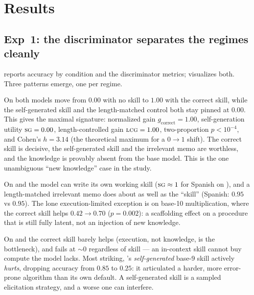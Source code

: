 \section{Results}
\label{sec:results}

\subsection{Exp~1: the discriminator separates the regimes cleanly}
\label{sec:results_exp1}

 reports accuracy by condition and  the
discriminator metrics;  visualizes both. Three patterns emerge, one per
regime.



 On \vocabzeth both models
move from $0.00$ with no skill to $1.00$ with the correct skill, while the self-generated skill
and the length-matched control both stay pinned at $0.00$. This gives the maximal \END
signature: normalized gain $g_{\text{correct}}=1.00$, self-generation utility $\textsc{sg}=0.00$,
length-controlled gain $\textsc{lcg}=1.00$, two-proportion $p<10^{-4}$, and Cohen's $h=3.14$ (the
theoretical maximum for a $0\to1$ shift). The correct skill is decisive, the self-generated
skill and the irrelevant memo are worthless, and the knowledge is provably absent from the base
model. This is the one unambiguous ``new knowledge'' case in the study.

 On \vocabes and \arithbten the
model can write its own working skill ($\textsc{sg}\approx1$ for Spanish on \claude), and a
length-matched irrelevant memo does about as well as the ``skill'' (Spanish: $0.95$ vs $0.95$).
The lone execution-limited exception is \gpt on base-10 multiplication, where the correct skill
helps $0.42\to0.70$ ($p=0.002$): a scaffolding effect on a procedure that is still fully latent,
not an injection of new knowledge.

 On \arithbnine and \arithbeleven the correct skill
barely helps \claude (execution, not knowledge, is the bottleneck), and \gpt fails at $\sim0$
regardless of skill --- an in-context skill cannot buy compute the model lacks. Most striking,
\claude's \emph{self-generated} base-9 skill actively \emph{hurts}, dropping accuracy from
$0.85$ to $0.25$: it articulated a harder, more error-prone algorithm than its own default. A
self-generated skill is a sampled elicitation strategy, and a worse one can interfere.

